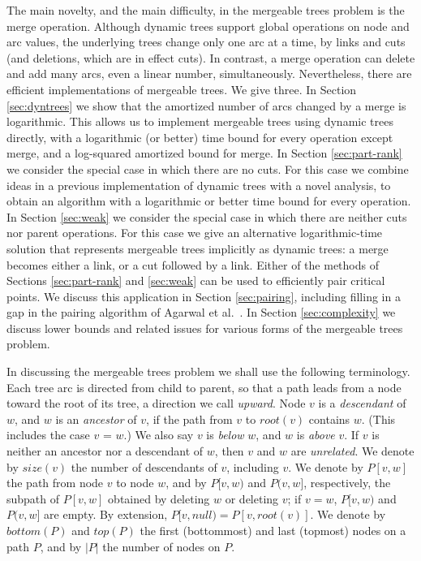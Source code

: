 \documentclass[twoside,leqno,twocolumn]{article}
\newcommand{\size}{\mathit{size}}
\newcommand{\topn}{\mathit{top}}
\newcommand{\nul}{\mathit{null}}
\newcommand{\rootn}{\mathit{root}}
\newcommand{\bottom}{\mathit{bottom}}
\begin{document}
The main novelty, and the main difficulty, in the mergeable trees problem is the merge operation.  Although dynamic trees support global operations on node and arc values, the underlying trees change only one arc at a time, by links and cuts (and deletions, which are in effect cuts).  In contrast, a merge operation can delete and add many arcs, even a linear number, simultaneously.  Nevertheless, there are efficient implementations of mergeable trees.  We give three.  In Section \ref{sec:dyntrees} we show that the amortized number of arcs changed by a merge is logarithmic.  This allows us to implement mergeable trees using dynamic trees directly, with a logarithmic (or better) time bound for every operation except merge, and a log-squared amortized bound for merge.  In Section \ref{sec:part-rank} we consider the special case in which there are no cuts.  For this case we combine ideas in a previous implementation of dynamic trees with a novel analysis, to obtain an algorithm with a logarithmic or better time bound for every operation.  In Section \ref{sec:weak} we consider the special case in which there are neither cuts nor parent operations.  For this case we give an alternative logarithmic-time solution that represents mergeable trees implicitly as dynamic trees: a merge becomes either a link, or a cut followed by a link.  Either of the methods of Sections \ref{sec:part-rank} and \ref{sec:weak} can be used to efficiently pair critical points.  We discuss this application in Section \ref{sec:pairing}, including filling in a gap in the pairing algorithm of Agarwal et al.~\cite{AEHW04,AEHW06}.  In Section \ref{sec:complexity} we discuss lower bounds and related issues for various forms of the mergeable trees problem.

In discussing the mergeable trees problem we shall use the following terminology.  Each tree arc is directed from child to parent, so that a path leads from a node toward the root of its tree, a direction we call \emph{upward}.  Node $v$ is a \emph{descendant} of $w$, and $w$ is an \emph{ancestor} of $v$, if the path from $v$ to $\rootn(v)$ contains $w$.  (This includes the case $v$ = $w$.)  We also say $v$ is \emph{below} $w$, and $w$ is \emph{above} $v$.  If $v$ is neither an ancestor nor a descendant of $w$, then $v$ and $w$ are \emph{unrelated}. We denote by $\size(v)$ the number of descendants of $v$, including $v$.  We denote by $P[v, w]$ the path from node $v$ to node $w$, and by $P[v, w)$ and $P(v, w]$, respectively, the subpath of $P[v, w]$ obtained by deleting $w$ or deleting $v$; if $v = w$, $P[v, w)$ and $P(v, w]$ are empty.  By extension, $P[v, \nul) = P[v, \rootn(v)]$.  We denote by $\bottom(P)$ and $\topn(P)$ the first (bottommost) and last (topmost) nodes on a path $P$, and by $|P|$ the number of nodes on $P$.
\end{document}
